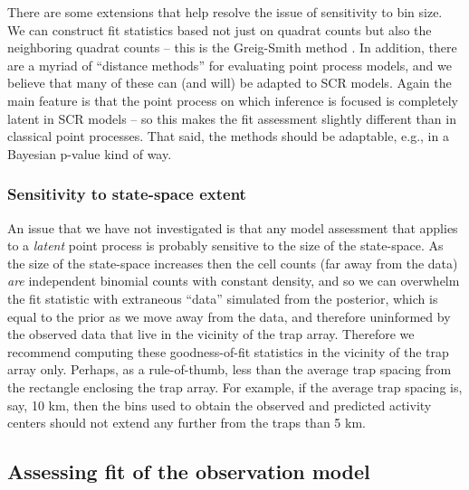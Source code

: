 There are some extensions that help resolve the issue of sensitivity
to bin size. We can construct fit statistics based not just
on quadrat counts but also the neighboring quadrat counts -- this is
the Greig-Smith method \citep{greig-smith:1964}.
In addition, there are a myriad of ``distance
methods'' for evaluating point process models,
 and we believe that many
of these can (and will) be adapted to SCR models.
Again the main
feature is that the point process on which inference is focused is
completely latent in SCR models -- so this makes the fit assessment
slightly different than in classical point processes. That said, the
methods should be adaptable, e.g., in a Bayesian p-value kind of way.


\subsubsection{Sensitivity to state-space extent}

An issue that we have not investigated is that any model assessment
that applies to a {\it latent} point process is probably sensitive to
the size of the state-space. As the size of the state-space increases
then the cell counts (far away from the data) {\it are} independent
binomial counts with constant density, and so we can overwhelm the fit
statistic with extraneous ``data'' simulated from the posterior, which
is equal to the prior as we move away from the data, and therefore
uninformed by the observed data  that live in the vicinity of the trap array.
Therefore we recommend computing these goodness-of-fit statistics in the vicinity
of the trap array only. Perhaps, as a rule-of-thumb, less than the
average trap spacing from the rectangle enclosing the trap array.
For example, if the average trap spacing is, say,
10 km, then the bins used to obtain the observed and predicted
activity centers should not extend any further from the traps than 5
km.




\subsection{Assessing  fit of the observation model}
\label{gof.sec.obsfit}

